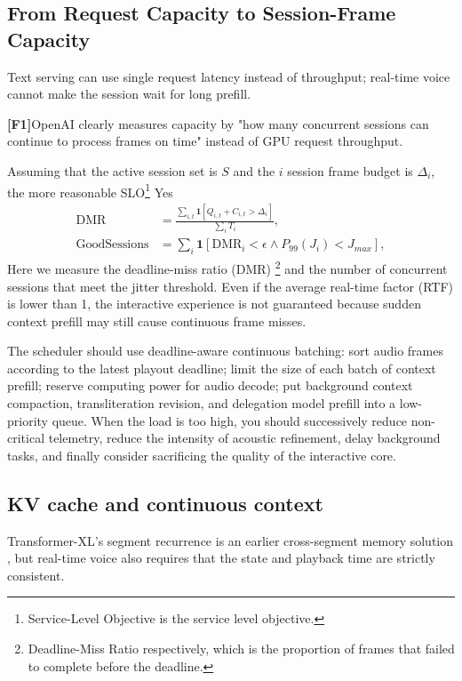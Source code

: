 \documentclass[UTF8,fontset=none,a4paper,10pt]{ctexart}
\newcommand{\FOne}{\textcolor{official}{\textbf{[F1]}}}
\begin{document}
\subsection{From Request Capacity to Session-Frame Capacity}

Text serving can use single request latency instead of throughput; real-time voice cannot make the session wait for long prefill.

\FOne OpenAI clearly measures capacity by "how many concurrent sessions can continue to process frames on time" instead of GPU request throughput\cite{openai2026continuous}.

Assuming that the active session set is $S$ and the $i$ session frame budget is $\Delta_i$, the more reasonable SLO\footnote{Service-Level Objective is the service level objective. } Yes
\begin{align}
\mathrm{DMR} &= \frac{\sum_{i,t}\mathbf 1[Q_{i,t}+C_{i,t}>\Delta_i]}{\sum_iT_i},\\
\mathrm{GoodSessions} &= \sum_i\mathbf 1[\mathrm{DMR}_i<\epsilon\land P_{99}(J_i)<J_{max}],
\end{align}
Here we measure the deadline-miss ratio (DMR) \footnote{Deadline-Miss Ratio respectively, which is the proportion of frames that failed to complete before the deadline. } and the number of concurrent sessions that meet the jitter threshold. Even if the average real-time factor (RTF) is lower than 1, the interactive experience is not guaranteed because sudden context prefill may still cause continuous frame misses.

The scheduler should use deadline-aware continuous batching: sort audio frames according to the latest playout deadline; limit the size of each batch of context prefill; reserve computing power for audio decode; put background context compaction, transliteration revision, and delegation model prefill into a low-priority queue. When the load is too high, you should successively reduce non-critical telemetry, reduce the intensity of acoustic refinement, delay background tasks, and finally consider sacrificing the quality of the interactive core.

\subsection{KV cache and continuous context}

Transformer-XL's segment recurrence is an earlier cross-segment memory solution \cite{dai2019transformerxl}, but real-time voice also requires that the state and playback time are strictly consistent.
\end{document}

